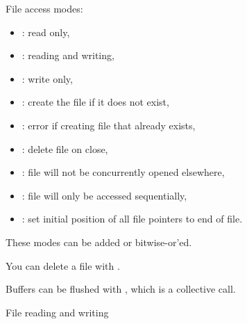 File access modes:
\begin{itemize}
\item  {}: read only,
\item  {}: reading and writing,
\item  {}: write only,
\item  {}: create the file if it does not exist,
\item  {}: error if creating file that already exists,
\item  {}: delete file on close,
\item  {}: file will not be concurrently opened
  elsewhere,
\item  {}: file will only be accessed sequentially,
\item  {}: set initial position of all file pointers to end
  of file.
\end{itemize}
These modes can be added or bitwise-or'ed.

You can delete a file with .

Buffers can be flushed with , which is a collective call.

 {File reading and writing}

